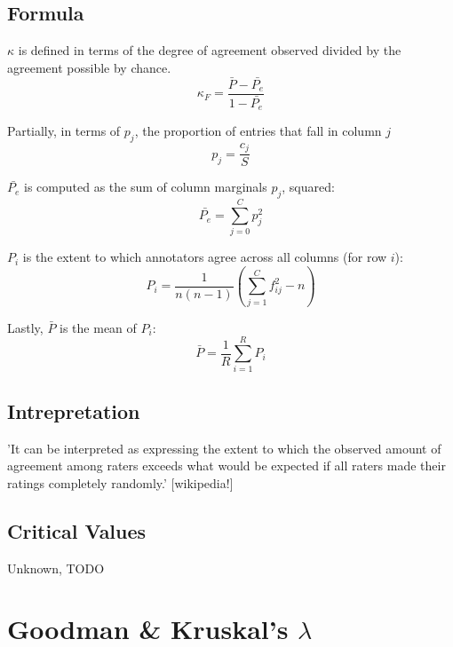 \documentclass[11pt]{article}
\begin{document}
\subsection{Formula}
$\kappa$ is defined in terms of the degree of agreement observed divided by the agreement possible by chance.
$$
\kappa_F = \frac{ \bar{P} - \bar{P_e} }{ 1 - \bar{P_e} }
$$

Partially, in terms of $p_j$, the proportion of entries that fall in column $j$
$$
p_j = \frac{ c_j }{S}
$$

$\bar{P_e}$ is computed as the sum of column marginals $p_j$, squared:
$$
\bar{P_e} = \sum_{j=0}^{C}{ p_j^2 }
$$

$P_i$ is the extent to which annotators agree across all columns (for row $i$):
$$
P_i = \frac{ 1 }{ n(n-1) }   \left( \sum_{j=1}^{C}{ f_{ij}^2 }  - n \right)
$$

Lastly, $\bar{P}$ is the mean of $P_i$:
$$
\bar{P} = \frac{ 1 }{ R }    \sum_{i=1}^{R}{ P_i }
$$


\subsection{Intrepretation}
'It can be interpreted as expressing the extent to which the observed amount of agreement among raters exceeds what would be expected if all raters made their ratings completely randomly.' [wikipedia!]

\subsection{Critical Values}
Unknown, TODO







\section{Goodman \& Kruskal's $\lambda$}
\label{section:goodmankruskallambda}
\end{document}
